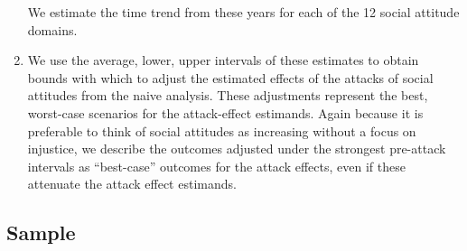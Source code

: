 \documentclass[
  singlecolumn]{report}
\begin{document}
\begin{enumerate}
  We estimate the time trend from these years for each of the 12 social
  attitude domains.
\item
  We use the average, lower, upper intervals of these estimates to
  obtain bounds with which to adjust the estimated effects of the
  attacks of social attitudes from the naive analysis. These adjustments
  represent the best, worst-case scenarios for the attack-effect
  estimands. Again because it is preferable to think of social attitudes
  as increasing without a focus on injustice, we describe the outcomes
  adjusted under the strongest pre-attack intervals as ``best-case''
  outcomes for the attack effects, even if these attenuate the attack
  effect estimands.
\end{enumerate}

\hypertarget{sample}{%
\subsection{Sample}\label{sample}}
\end{document}
